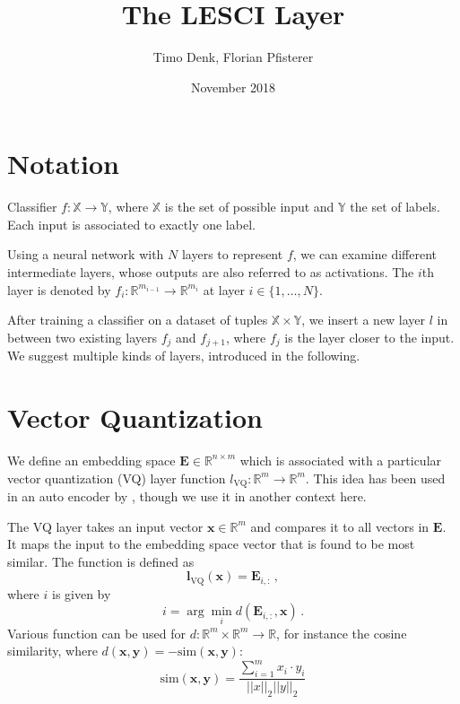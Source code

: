 \documentclass{article}
\title{The LESCI Layer}
\author{Timo Denk, Florian Pfisterer}
\date{November 2018}
\begin{document}
\maketitle

\section{Notation}
Classifier $f:\mathbb{X}\rightarrow\mathbb{Y}$, where $\mathbb{X}$ is the set of possible input and $\mathbb{Y}$ the set of labels. Each input is associated to exactly one label. 

Using a neural network with $N$ layers to represent $f$, we can examine different intermediate layers, whose outputs are also referred to as activations. The $i$th layer is denoted by $f_i: \mathbb{R}^{m_{i-1}} \rightarrow \mathbb{R}^{m_{i}}$ at layer $i \in \{1,\ldots,N\}$.

After training a classifier on a dataset of tuples $\mathbb{X}\times\mathbb{Y}$, we insert a new layer $l$ in between two existing layers $f_j$ and $f_{j+1}$, where $f_j$ is the layer closer to the input. We suggest multiple kinds of layers, introduced in the following.

\section{Vector Quantization}

We define an embedding space $\bm{E}\in\mathbb{R}^{n\times m}$ which is associated with a particular vector quantization (VQ) layer function $l_\text{VQ}:\mathbb{R}^m\rightarrow\mathbb{R}^m$.
This idea has been used in an auto encoder by \cite{vq-vae}, though we use it in another context here.

The VQ layer takes an input vector $\bm{x}\in\mathbb{R}^m$ and compares it to all vectors in $\bm{E}$. It maps the input to the embedding space vector that is found to be most similar. The function is defined as
\begin{equation}
    \bm{l}_\text{VQ}\left(\bm{x}\right)=\bm{E}_{i,:}\,,
\end{equation}
where $i$ is given by
\begin{equation}
    i=\arg\min_i d\left(\bm{E}_{i,:},\bm{x}\right)\,.
    \label{vq-argmin}
\end{equation}
Various function can be used for $d:\mathbb{R}^{m}\times\mathbb{R}^{m}\rightarrow\mathbb{R}$, for instance the cosine similarity, where $d(\bm{x}, \bm{y})=-\text{sim}(\bm{x}, \bm{y})$:
\begin{equation}
    \text{sim}(\bm{x}, \bm{y}) = \frac{\sum^m_{i=1} x_i\cdot y_i}{||x||_2 ||y||_2}
    \label{cos-sim}
\end{equation}
\end{document}
